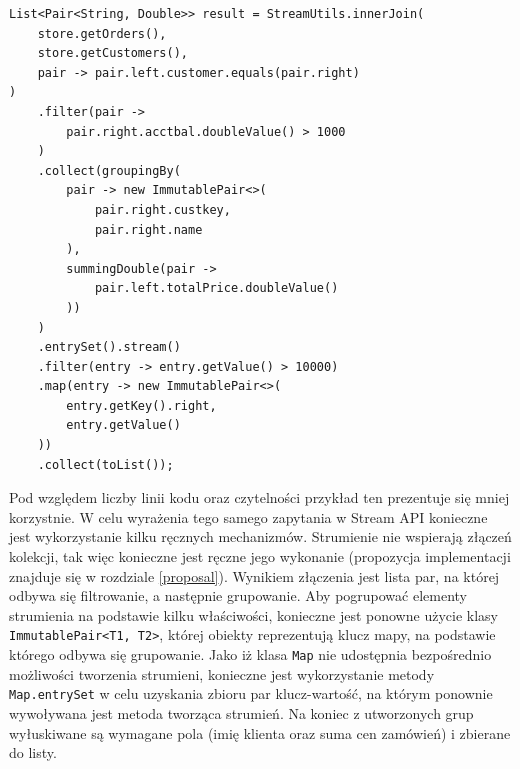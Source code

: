 \documentclass[12pt,twoside,openright]{extarticle}
\begin{document}
\begin{lstlisting}[label=streamsexample, caption=Analogiczne rozwiązanie wykorzystujące Stream API]
List<Pair<String, Double>> result = StreamUtils.innerJoin(
    store.getOrders(),
    store.getCustomers(),
    pair -> pair.left.customer.equals(pair.right)
)
    .filter(pair ->
        pair.right.acctbal.doubleValue() > 1000
    )
    .collect(groupingBy(
        pair -> new ImmutablePair<>(
            pair.right.custkey,
            pair.right.name
        ),
        summingDouble(pair ->
            pair.left.totalPrice.doubleValue()
        ))
    )
    .entrySet().stream()
    .filter(entry -> entry.getValue() > 10000)
    .map(entry -> new ImmutablePair<>(
        entry.getKey().right,
        entry.getValue()
    ))
    .collect(toList());
\end{lstlisting}

    Pod względem liczby linii kodu oraz czytelności przykład ten prezentuje się mniej korzystnie. W celu wyrażenia tego samego zapytania w Stream API konieczne jest wykorzystanie kilku ręcznych mechanizmów. Strumienie nie wspierają złączeń kolekcji, tak więc konieczne jest ręczne jego wykonanie (propozycja implementacji znajduje się w rozdziale \ref{proposal}). Wynikiem złączenia jest lista par, na której odbywa się filtrowanie, a następnie grupowanie. Aby pogrupować elementy strumienia na podstawie kilku właściwości, konieczne jest ponowne użycie klasy \texttt{ImmutablePair<T1, T2>}, której obiekty reprezentują klucz mapy, na podstawie którego odbywa się grupowanie. Jako iż klasa \texttt{Map} nie udostępnia bezpośrednio możliwości tworzenia strumieni, konieczne jest wykorzystanie metody \texttt{Map.entrySet} w celu uzyskania zbioru par klucz-wartość, na którym ponownie wywoływana jest metoda tworząca strumień. Na koniec z utworzonych grup wyłuskiwane są wymagane pola (imię klienta oraz suma cen zamówień) i zbierane do listy.
\end{document}
